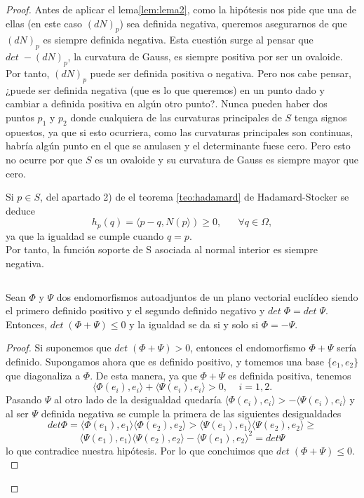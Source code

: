 \begin{proof}
	Antes de aplicar el lema\ref{lem:lema2}, como la hipótesis nos pide que una de ellas (en este caso $(dN)_p$) sea definida negativa, queremos asegurarnos de que $(dN)_p$ es siempre definida negativa. Esta cuestión surge al pensar que $det \; -(dN)_p$, la curvatura de Gauss, es siempre positiva por ser un ovaloide. Por tanto, $(dN)_p$ puede ser definida positiva o negativa. Pero nos cabe pensar, ¿puede ser definida negativa (que es lo que queremos) en un punto dado y cambiar a definida positiva en algún otro punto?. Nunca pueden haber dos puntos $p_1$ y $p_2$ donde cualquiera de las curvaturas principales de $S$ tenga signos opuestos, ya que si esto ocurriera, como las curvaturas principales son continuas, habría algún punto en el que se anulasen y el determinante fuese cero. Pero esto no ocurre por que $S$ es un ovaloide y su curvatura de Gauss es siempre mayor que cero.
	${ }$\\
	
	\begin{observacion}
		Si $p \in S$, del apartado 2) de el teorema \ref{teo:hadamard} de Hadamard-Stocker se deduce
		\[
			h_p (q) = \langle p - q, N(p \rangle) \geq 0, \;\;\;\;\;\; \forall q \in \Omega,
		\]
		ya que la igualdad se cumple cuando $q = p$.
		${ }$\\
		
		Por tanto, la función soporte de S asociada al normal interior es siempre negativa.
	\end{observacion}
	${ }$\\
	
	\begin{lema} \label{lem:lema2}
		Sean $\Phi$ y $\Psi$ dos endomorfismos autoadjuntos de un plano vectorial euclídeo siendo el primero definido positivo y el segundo definido negativo y $det \; \Phi = det \; \Psi$. Entonces, $det \; (\Phi + \Psi) \leq 0$ y la igualdad se da si y solo si $\Phi = - \Psi$.
	\end{lema}
	\begin{proof}
		Si suponemos que $det \; (\Phi + \Psi) > 0$, entonces el endomorfismo $\Phi + \Psi$ sería definido. Supongamos ahora que es definido positivo, y tomemos una base $\{ e_1, e_2 \}$ que diagonaliza a $\Phi$. De esta manera, ya que $\Phi + \Psi$ es definida positiva, tenemos
		${ }$\\
		\[
				\langle \Phi(e_i), e_i \rangle + \langle \Psi(e_i), e_i \rangle > 0, \;\;\;\; i = 1, 2.
		\]
		${ }$\\
		
		Pasando $\Psi$ al otro lado de la desigualdad quedaría $\langle \Phi(e_i), e_i \rangle  > -\langle \Psi(e_i), e_i \rangle$ y al ser $\Psi$ definida negativa se cumple la primera de las siguientes desigualdades
		${ }$\\
		$$
			det \Phi = \langle \Phi(e_1), e_1 \rangle \langle \Phi(e_2), e_2 \rangle > \langle \Psi(e_1), e_1 \rangle \langle \Psi(e_2), e_2 \rangle \geq $$
			$$ \langle \Psi(e_1), e_1 \rangle \langle \Psi(e_2), e_2 \rangle - \langle \Psi(e_1), e_2 \rangle^2 = det \Psi
		$$
		${ }$\\
		lo que contradice nuestra hipótesis. Por lo que concluimos que $ det \; (\Phi + \Psi) \leq 0$.
		${ }$\\
		

\end{proof}
\end{proof}
